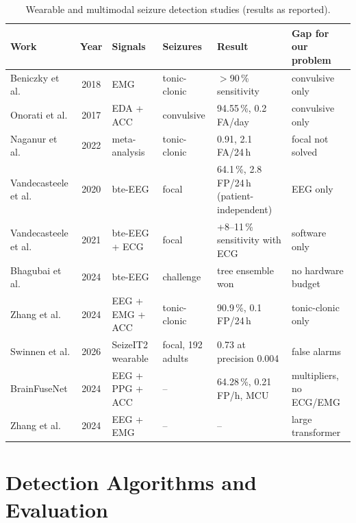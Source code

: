 \begin{table}[htbp]
\centering\small
\caption{Wearable and multimodal seizure detection studies (results as reported).}\label{tab:lit-wearable}
\begin{tabularx}{\textwidth}{@{}P{30mm}cP{22mm}P{22mm}LL@{}}
\toprule
\textbf{Work} & \textbf{Year} & \textbf{Signals} & \textbf{Seizures} & \textbf{Result} & \textbf{Gap for our problem}\\
\midrule
Beniczky et al. \cite{beniczky2018emg} & 2018 & EMG & tonic-clonic & $>$90\,\% sensitivity & convulsive only\\
Onorati et al. \cite{onorati2017empatica} & 2017 & EDA + ACC & convulsive & 94.55\,\%, 0.2 FA/day & convulsive only\\
Naganur et al. \cite{naganur2022meta} & 2022 & meta-analysis & tonic-clonic & 0.91, 2.1 FA/24\,h & focal not solved\\
Vandecasteele et al. \cite{vandecasteele2020bte} & 2020 & bte-EEG & focal & 64.1\,\%, 2.8 FP/24\,h (patient-independent) & EEG only\\
Vandecasteele et al. \cite{vandecasteele2021ecg} & 2021 & bte-EEG + ECG & focal & +8--11\,\% sensitivity with ECG & software only\\
Bhagubai et al. \cite{bhagubai2024challenge} & 2024 & bte-EEG & challenge & tree ensemble won & no hardware budget\\
Zhang et al. \cite{zhang2024tcs} & 2024 & EEG + EMG + ACC & tonic-clonic & 90.9\,\%, 0.1 FP/24\,h & tonic-clonic only\\
Swinnen et al. \cite{swinnen2026seizeit2} & 2026 & SeizeIT2 wearable & focal, 192 adults & 0.73 at precision 0.004 & false alarms\\
BrainFuseNet \cite{ingolfsson2024brainfusenet} & 2024 & EEG + PPG + ACC & -- & 64.28\,\%, 0.21 FP/h, MCU & multipliers, no ECG/EMG\\
Zhang et al. \cite{zhang2024cyclic} & 2024 & EEG + EMG & -- & -- & large transformer\\
\bottomrule
\end{tabularx}
\end{table}

\section{Detection Algorithms and Evaluation}\label{sec:lit-alg}

